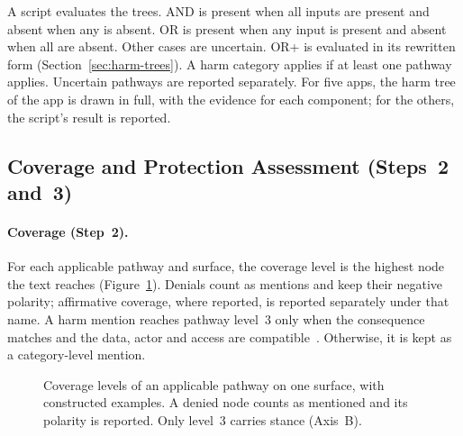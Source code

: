 A script evaluates the trees. AND is present when all inputs are present and absent when any is
absent. OR is present when any input is present and absent when all are absent. Other cases are
uncertain. OR+ is evaluated in its rewritten form (Section~\ref{sec:harm-trees}). A harm
category applies if at least one pathway applies. Uncertain pathways are reported separately.
For five apps, the harm tree of the app is drawn in full, with the evidence
for each component; for the others, the script's result is reported.

\subsection{Coverage and Protection Assessment (Steps~2 and~3)}
\label{sec:assessment}
\paragraph{Coverage (Step~2).} For each applicable pathway and surface, the coverage level is
the highest node the text reaches (Figure~\ref{fig:coverage-levels}). Denials count as mentions
and keep their negative polarity; affirmative coverage, where reported, is reported separately
under that name. A harm mention reaches pathway level~3 only when the consequence matches and the
data, actor and access are compatible~\parencite{shvartzshnaider2019going}. Otherwise, it is
kept as a category-level mention.

\begin{figure}[H]
\centering
{}
\caption[Coverage levels of a pathway]{Coverage levels of an applicable pathway on one
surface, with constructed examples. A denied node counts as mentioned and its polarity is
reported. Only level~3 carries stance (Axis~B).}
\label{fig:coverage-levels}
\end{figure}

